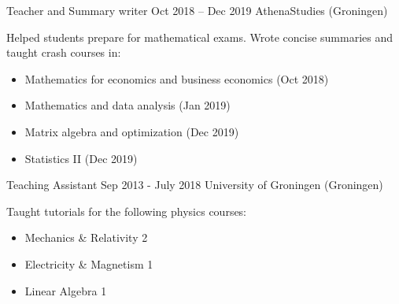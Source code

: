\workentrytextonly
{Teacher and Summary writer}
{Oct 2018 -- Dec 2019}
{AthenaStudies (Groningen)}
{Helped students prepare for mathematical exams. Wrote concise summaries and taught crash courses in:
\begin{itemize}[noitemsep]
    \item{} Mathematics for economics and business economics (Oct 2018)
    \item{} Mathematics and data analysis (Jan 2019)
    \item{} Matrix algebra and optimization (Dec 2019)
    \item{} Statistics II (Dec 2019)
\end{itemize}
}

\workentrytextonly
{Teaching Assistant}
{Sep 2013 - July 2018}
{University of Groningen (Groningen)}
{
 Taught tutorials for the following physics courses:
 \begin{itemize}[noitemsep]
    \item{} Mechanics \& Relativity 2
    \item{} Electricity \& Magnetism 1
    \item{} Linear Algebra 1 
 \end{itemize}
}